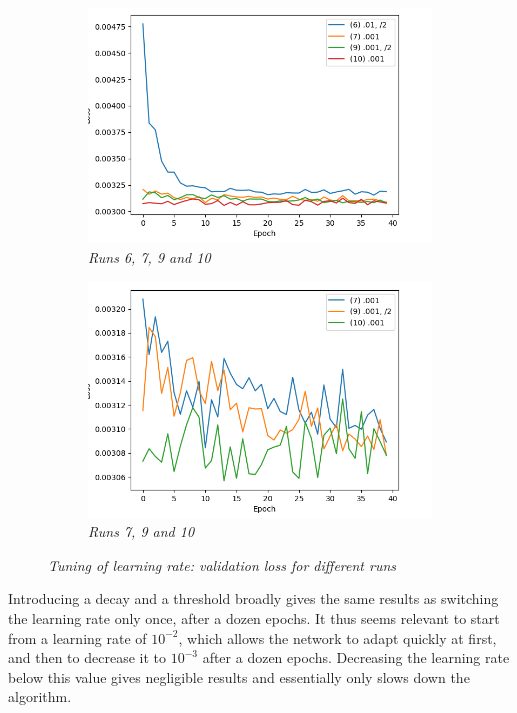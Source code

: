 \documentclass{article}
\begin{document}
\begin{figure}[!ht]
\begin{subfigure}{.39\linewidth}
                \end{subfigure}
                \begin{subfigure}{.49\linewidth}
                    \centering
                    \includegraphics[width=\linewidth]{pics/hpp-lr-loss-67910.png}
                    \caption{\textit{Runs 6, 7, 9 and 10}}
                \end{subfigure}
                \begin{subfigure}{.49\linewidth}
                    \centering
                    \includegraphics[width=\linewidth]{pics/hpp-lr-loss-7910.png}
                    \caption{\textit{Runs 7, 9 and 10}}
                \end{subfigure}
                \caption{\textit{Tuning of learning rate: validation loss for different runs}}
            \end{figure}
            \par
            Introducing a decay and a threshold broadly gives the same results as switching the learning rate only once, after a dozen epochs. It thus seems relevant to start from a learning rate of $10^{-2}$, which allows the network to adapt quickly at first, and then to decrease it to $10^{-3}$ after a dozen epochs. Decreasing the learning rate below this value gives negligible results and essentially only slows down the algorithm.
\end{document}

